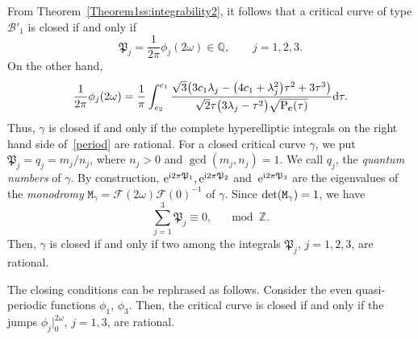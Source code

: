 \documentclass[pdftex]{sigma}
\numberwithin{equation}{section}
\def\Q{\mathbb{Q}}
\begin{document}
From Theorem~\ref{Theorem1ss:integrability2}, it follows that a critical curve of type ${\mathcal B}'_1$
is closed if and only if
\[
 {\mathfrak P}_j=\frac{1}{2\pi}\phi_j(2\omega)\in \Q,\qquad j=1,2,3.
\]
On the other hand,
\begin{equation}\label{period}
 \frac{1}{2\pi}\phi_j(2\omega)=\frac{1}{\pi}\int_{e_2}^{e_1} \frac{\sqrt{3}\big(3c_1\lambda_j-\big(4c_1+\lambda_j^2\big)\tau^2+3\tau^3\big)} {\sqrt{2}\tau\big(3\lambda_j-\tau^2\big)\sqrt{{\rm P}_{{\bf c}}(\tau)}}{\rm d}\tau.
 \end{equation}
Thus, $\gamma$ is closed if and only if the complete hyperelliptic integrals on the right hand side of~\eqref{period} are rational.
For a closed critical curve $\gamma$, we put ${\mathfrak P}_j= q_j=m_j/n_j$, where $n_j>0$ and $\gcd(m_j,n_j)=1$.
We call $q_j$, the \emph{quantum numbers} of $\gamma$.
By construction, ${\rm e}^{{\rm i}2\pi{\mathfrak P}_1}, {\rm e}^{{\rm i}2\pi {\mathfrak P}_2}$ and~${\rm e}^{{\rm i}2\pi {\mathfrak P}_3}$ are the eigenvalues of the \emph{monodromy} ${\mathtt M}_{\gamma}={\mathcal F}(2\omega){\mathcal F}(0)^{-1}$ of $\gamma$.
Since ${\rm det}({\mathtt M}_{\gamma})=1$, we have
\[
 \sum_{j=1}^{3} {\mathfrak P}_j\equiv 0,\quad \mod{\mathbb Z}.
\]
 Then, $\gamma$ is closed if and only if two among the integrals ${\mathfrak P}_j$, $j=1,2,3$, are rational.

\begin{Remark}
 The closing conditions can be rephrased as follows. Consider the even quasi-periodic functions $\phi_1$, $\phi_3$.
 Then, the critical curve is closed if and only if the jumps $\phi_j|_0^{2\omega}$, $j=1,3$, are rational.
 \end{Remark}
\end{document}
